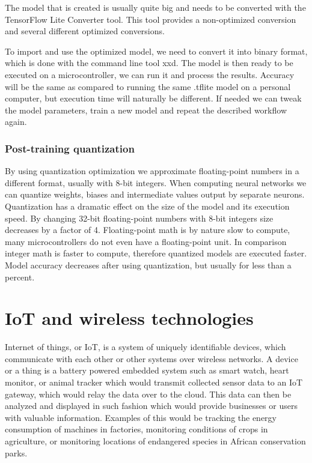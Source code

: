 The model that is created is usually quite big and needs to be converted with the TensorFlow Lite Converter tool.
This tool provides a non-optimized conversion and several different optimized conversions.

To import and use the optimized model, we need to convert it into binary format, which is done with the command line tool xxd.
The model is then ready to be executed on a microcontroller, we can run it and process the results.
Accuracy will be the same as compared to running the same .tflite model on a personal computer, but execution time will naturally be different.
If needed we can tweak the model parameters, train a new model and repeat the described workflow again.


\subsubsection{ Post-training quantization}

By using quantization optimization we approximate floating-point numbers in a different format, usually with 8-bit integers.
When computing neural networks we can quantize weights, biases and intermediate values output by separate neurons. 
Quantization has a dramatic effect on the size of the model and its execution speed.
By changing 32-bit floating-point numbers with 8-bit integers size decreases by a factor of 4.
Floating-point math is by nature slow to compute, many microcontrollers do not even have a floating-point unit.
In comparison integer math is faster to compute, therefore quantized models are executed faster.
Model accuracy decreases after using quantization, but usually for less than a percent.
 

\section{ IoT and wireless technologies}

Internet of things, or IoT, is a system of uniquely identifiable devices, which communicate with each other or other systems over wireless networks\cite{IoT}.
A device or a thing is a battery powered embedded system such as smart watch, heart monitor, or animal tracker which would transmit collected sensor data to an IoT gateway, which would relay the data over to the cloud.
This data can then be analyzed and displayed in such fashion which would provide businesses or users with valuable information.
Examples of this would be tracking the energy consumption of machines in factories, monitoring conditions of crops in agriculture, or monitoring locations of endangered species in African conservation parks.

